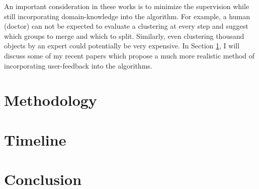 \documentclass[11pt]{article}
\begin{document}
\vspace{0.1in}\noindent An important consideration in these works is to minimize the supervision while still incorporating domain-knowledge into the algorithm. For example, a human (doctor) can not be expected to evaluate a clustering at every step and suggest which groups to merge and which to split. Similarly, even clustering thousand objects by an expert could potentially be very expensive. In Section \ref{section:methodology}, I will discuss some of my recent papers which propose a much more realistic method of incorporating user-feedback into the algorithms.

\section{Methodology}
\label{section:methodology}

\section{Timeline}
\label{section:timeline}

\section{Conclusion}
\end{document}
